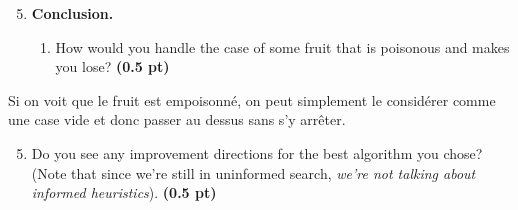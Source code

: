 \documentclass[11pt,a4paper]{../template/report}
\begin{document}
\begin{enumerate}
\setcounter{enumi}{4}
\item \textbf{Conclusion.}
\begin{enumerate}
        \item How would you handle the case of some fruit that is poisonous and makes
you lose?
\textbf{(0.5 pt)}
\end{enumerate}

\end{enumerate}

\begin{answer}
Si on voit que le fruit est empoisonné, on peut simplement le considérer comme une case vide et donc passer au dessus sans s'y arrêter.
\end{answer}

\begin{enumerate}
\setcounter{enumi}{4}
\begin{enumerate}
\setcounter{enumii}{4}
        \item  Do you see any improvement directions for the best algorithm you chose? (Note that since we're still in uninformed search, \textit{we're not talking about informed heuristics}). \textbf{(0.5 pt)}
\end{enumerate}

\end{enumerate}

\begin{answer}
\end{answer}
\end{document}
